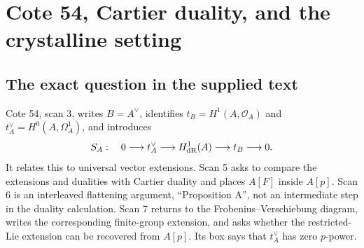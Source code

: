 \documentclass[11pt,a4paper]{article}
\theoremstyle{definition}\newtheorem{remark}[theorem]{Remark}
\begin{document}
\section{Cote 54, Cartier duality, and the crystalline setting}

\subsection{The exact question in the supplied text}

Cote 54, scan 3, writes $B=A^\vee$, identifies $t_B=H^1(A,\mathcal O_A)$ and $t_A^\vee=H^0(A,\Omega_A^1)$, and introduces
\begin{equation}\label{eq:SA}
 S_A:\quad 0\longrightarrow t_A^\vee\longrightarrow H^1_{\mathrm{dR}}(A)
 \longrightarrow t_B\longrightarrow0.
\end{equation}
It relates this to universal vector extensions. Scan 5 asks to compare the extensions and dualities with Cartier duality and places $A[F]$ inside $A[p]$. Scan 6 is an interleaved flattening argument, ``Proposition A'', not an intermediate step in the duality calculation. Scan 7 returns to the Frobenius--Verschiebung diagram, writes the corresponding finite-group extension, and asks whether the restricted-Lie extension can be recovered from $A[p]$. Its box says that $t_A^\vee$ has zero $p$-power.
\end{document}
